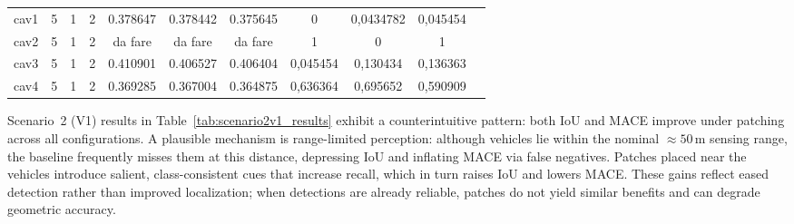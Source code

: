 \begin{table}[H]
\begin{adjustbox}{max width=\textwidth}
\begin{tabularx}{\textwidth}{l c c c c c c c c c c}
            cav1        & 5  & 1 & 2 & 0.378647 & 0.378442  & 0.375645 & 0 & 0,0434782 & 0,045454 \\
            cav2        & 5  & 1 & 2 & da fare  & da fare   & da fare  & 1 & 0 & 1 \\
            cav3        & 5  & 1 & 2 & 0.410901 & 0.406527  & 0.406404 & 0,045454 & 0,130434 & 0,136363 \\
            cav4        & 5  & 1 & 2 & 0.369285 & 0.367004  & 0.364875 & 0,636364 & 0,695652 & 0,590909 \\
            \bottomrule
        \end{tabularx}
    \end{adjustbox}
\end{table}

Scenario~2 (V1) results in Table~\ref{tab:scenario2v1_results} exhibit a counterintuitive pattern: both IoU and MACE improve under patching across all configurations.
A plausible mechanism is range-limited perception: although vehicles lie within the nominal \(\approx 50\,\mathrm{m}\) sensing range, the baseline frequently misses them at this distance, depressing IoU and inflating MACE via false negatives.
Patches placed near the vehicles introduce salient, class-consistent cues that increase recall, which in turn raises IoU and lowers MACE.
These gains reflect eased detection rather than improved localization; when detections are already reliable, patches do not yield similar benefits and can degrade geometric accuracy.


